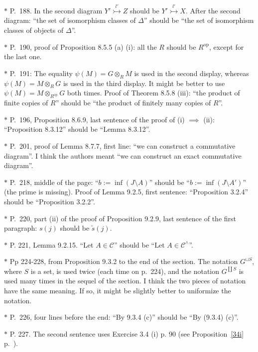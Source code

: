 \documentclass[12pt]{article}
\theoremstyle{remark}
\theoremstyle{definition}
\newcommand{\C}{\mathcal C}
\DeclareMathOperator{\op}{op}
\begin{document}
\noindent $*$ P.~188. In the second diagram $Y'\overset{l'}{\rightarrowtail}Z$ should be $Y'\overset{l'}{\rightarrowtail}X$. After the second diagram: ``the set of isomorphism classes of $\Delta$'' should be ``the set of isomorphism classes of objects of $\Delta$''.

\noindent $*$ P.~190, proof of Proposition 8.5.5 (a) (i): all the $R$ should be $R^{\op}$, except for the last one.

\noindent $*$ P.~191: The equality $\psi(M)=G\otimes_RM$ is used in the second display, whereas $\psi(M)=M\otimes_RG$ is used in the third display. It might be better to use $\psi(M)=M\otimes_{R^{\op}}G$ both times. Proof of Theorem 8.5.8 (iii): ``the product of finite copies of $R$'' should be ``the product of finitely many copies of $R$''.

\noindent $*$ P.~196, Proposition 8.6.9, last sentence of the proof of (i) $\implies$ (ii): ``Proposition 8.3.12'' should be ``Lemma 8.3.12''.


\noindent $*$ P.~201, proof of Lemma 8.7.7, first line: ``we can construct a commutative diagram''. I think the authors meant ``we can construct an exact commutative diagram''.

\noindent $*$ P.~218, middle of the page: ``$b:=\inf(J\setminus A)$'' should be ``$b:=\inf(J\setminus A')$'' (the prime is missing). Proof of Lemma 9.2.5, first sentence: ``Proposition 3.2.4'' should be ``Proposition 3.2.2''.

\noindent $*$ P.~220, part (ii) of the proof of Proposition 9.2.9, last sentence of the first paragraph: $s(j)$ should be $\tilde s(j)$.

\noindent $*$ P. 221, Lemma 9.2.15. ``Let $A\in\C$'' should be ``Let $A\in\C^\wedge$''.

\noindent $*$ Pp 224-228, from Proposition 9.3.2 to the end of the section. The notation $G^{\sqcup S}$, where $S$ is a set, is used twice (each time on p.~224), and the notation $G^{\coprod S}$ is used many times in the sequel of the section. I think the two pieces of notation have the same meaning. If so, it might be slightly better to uniformize the notation.

\noindent $*$ P.~226, four lines before the end: ``By 9.3.4 (c)'' should be ``By (9.3.4) (c)''.

\noindent $*$ P. 227. The second sentence uses Exercise 3.4 (i) p. 90 (see Proposition~\ref{34i} p.~\pageref{34i}).
\end{document}
